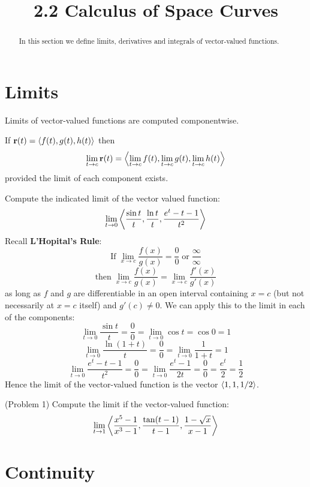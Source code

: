 \documentclass[handout]{ximera}
\title{2.2 Calculus of Space Curves}
\begin{document}
\begin{abstract}
In this section we define limits, derivatives and integrals of vector-valued functions.
\end{abstract}

\maketitle

\section{Limits}
Limits of vector-valued functions are computed componentwise. 
\begin{definition}
If $\mathbf r(t) = \left\langle f(t), g(t), h(t)\right\rangle$ then
\[
\lim_{t \to c} \mathbf r(t) = \left\langle \lim_{t \to c}f(t), \lim_{t \to c}g(t),\lim_{t \to c} h(t)\right\rangle
\]
provided the limit of each component exists.
\end{definition}

\begin{example}[Example 1]
Compute the indicated limit of the vector valued function:
\[
\lim_{t \to 0} \left\langle \frac{\sin t}{t}, \frac{\ln t}{t}, \frac{e^t - t -1}{t^2}\right\rangle
\]
Recall \textbf{L'Hopital's Rule}:
\[
\text{If}\; \lim_{x \to c} \frac{f(x)}{g(x)} = \frac00 \; \text{or} \; \frac{\infty}{\infty} 
\]
\[
\text{then} \; \lim_{x \to c} \frac{f(x)}{g(x)} = \lim_{x \to c} \frac{f'(x)}{g'(x)}
\]
as long as $f$ and $g$ are differentiable in an open interval containing $x = c$ (but not necessarily at $x = c$ itself)
and $g'(c) \neq 0$. We can apply this to the limit in each of the components:
\[
\lim_{t \to 0} \frac{\sin t}{t} = \frac00 = \lim_{t\to 0} \cos t = \cos 0  = 1
\]
\[
\lim_{t \to 0} \frac{\ln(1+t)}{t} = \frac00 = \lim_{t\to 0} \frac{1}{1+t} = 1
\]
\[
\lim_{t \to 0} \frac{e^t - t - 1}{t^2} = \frac00 = \lim_{t\to 0} \frac{e^t - 1}{2t} = \frac00 = \frac{e^t}{2}  = \frac12
\]
Hence the limit of the vector-valued function is the vector $\left\langle 1, 1, 1/2\right\rangle$.
\end{example}

\begin{problem}(Problem 1)
Compute the limit if the vector-valued function:
\[
\lim_{t \to 1} \left\langle \frac{x^5 - 1}{x^3 - 1}, \frac{\tan(t-1)}{t-1}, \frac{1 - \sqrt x}{x-1}\right\rangle
\]
\end{problem}

\section{Continuity}
\end{document}
